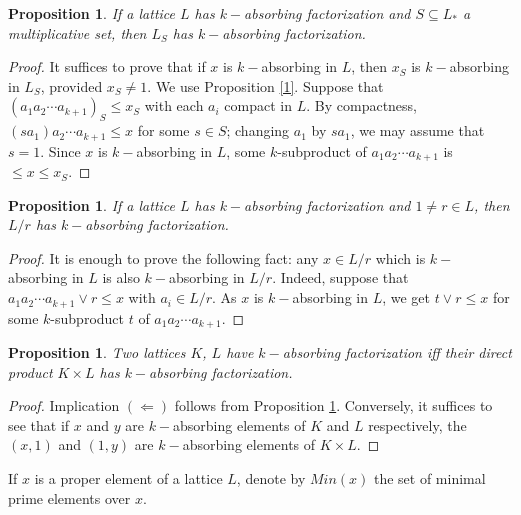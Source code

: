 \documentclass{amsart}
\theoremstyle{plain}
\newtheorem{proposition}[theorem]{Proposition}
\theoremstyle{definition}
\theoremstyle{remark}
\begin{document}
\begin{proposition}\label{2}
If a lattice $L$ has $k-$absorbing factorization  and   $S\subseteq L_\ast$ a multiplicative set, then $L_S$ has $k-$absorbing factorization.
\end{proposition}

\begin{proof}
It suffices to prove that if $x$ is   $k-$absorbing in $L$, then $x_S$ is   $k-$absorbing in $L_S$, provided $x_S\neq 1$.
 We use Proposition \ref{1}.  Suppose that 
$(a_1a_2\cdots {a_{k+1}})_S\leq x_S$ with each $a_i$  compact in $L$.
By compactness, $(sa_1)a_2\cdots {a_{k+1}}\leq x$ for some $s\in S$; changing $a_1$ by $sa_1$, we may assume that $s=1$. Since $x$ is   $k-$absorbing in $L$, some $k$-subproduct of $a_1a_2\cdots {a_{k+1}}$ is $\leq x\leq x_S$.
\end{proof}

\begin{proposition}\label{3}
If a lattice $L$ has $k-$absorbing factorization  and   $1\neq r\in L$, then $L/r$ has $k-$absorbing factorization.
\end{proposition}

\begin{proof}
It is enough to prove the following fact: any $x\in L/r$ which is   $k-$absorbing in $L$ is  also $k-$absorbing in $L/r$.
Indeed, suppose that $a_1a_2   \cdots   a_{k+1}\vee r \leq x$ with 
$a_i\in L/r$.
As $x$ is $k-$absorbing in $L$, we get 
 $t\vee r\leq x$ for some $k$-subproduct $t$ of $a_1a_2\cdots a_{k+1}$.
\end{proof}

\begin{proposition}\label{18}
Two lattices $K$, $L$ have $k-$absorbing factorization iff their direct product $K\times L$ has $k-$absorbing factorization.
\end{proposition}
\begin{proof}
Implication $(\Leftarrow)$  follows from Proposition \ref{3}.
Conversely, it suffices to see that if $x$ and $y$  are $k-$absorbing elements of $K$ and $L$ respectively, the $(x,1)$ and $(1,y)$ are $k-$absorbing elements of $K\times L$.
\end{proof}


If $x$ is a proper element of a lattice $L$, denote by $Min(x)$ the set of minimal prime elements over $x$.
\end{document}
